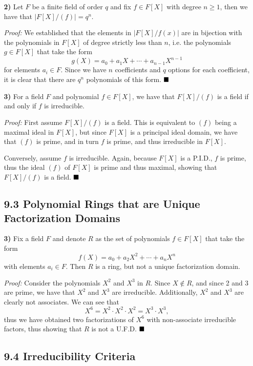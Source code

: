 \documentclass[12pt]{article}
\newcommand{\vertb}[1]{\left\vert#1\right\vert}
\newcommand{\proof}{\textit{Proof: }}
\newcommand{\done}{\ensuremath{\strut\hfill\blacksquare}}
\newcommand{\sectionskip}{\vspace{0.1in}}
\begin{document}
\sectionskip

\textbf{2)}
Let \( F \) be a finite field of order \( q \) and fix \( f \in F[X] \) with
degree \( n \geq 1 \), then we have that
\( \vertb{F[X]/(f)} = q^n \).

\proof
We established that the elements in \( \vertb{F[X]/f(x)} \) are in bijection
with the polynomials in \( F[X] \) of degree strictly less than \( n \),
i.e. the polynomials \( g \in F[X] \) that take the form
\[
	g(X) = a_0 + a_1X + \cdots + a_{n - 1}X^{n - 1}
\]
for elements \( a_i \in F \).
Since we have \( n \) coefficients and \( q \) options for each coefficient,
it is clear that there are \( q^n \) polynomials of this form.
\done

\textbf{3)}
For a field \( F \) and polynomial \( f \in F[X] \), we have that
\( F[X]/(f) \) is a field if and only if \( f \) is irreducible.

\proof
First assume \( F[X]/(f) \) is a field.
This is equivalent to \( (f) \) being a maximal ideal in \( F[X] \), but
since \( F[X] \) is a principal ideal domain, we have that \( (f) \) is prime,
and in turn \( f \) is prime, and thus irreducible in \( F[X] \).

Conversely, assume \( f \) is irreducible.
Again, because \( F[X] \) is a P.I.D., \( f \) is prime, thus the ideal
\( (f) \) of \( F[X] \) is prime and thus maximal, showing that
\( F[X]/(f) \) is a field.
\done

\subsection*{9.3 Polynomial Rings that are Unique Factorization Domains}

\textbf{3)}
Fix a field \( F \) and denote \( R \) as the set of polynomials
\( f \in F[X] \) that take the form
\[
	f(X) = a_0 + a_2X^2 + \cdots + a_nX^n
\]
with elements \( a_i \in F \).
Then \( R \) is a ring, but not a unique factorization domain.

\proof
Consider the polynomials \( X^2 \) and \( X^3 \) in \( R \).
Since \( X \notin R \), and since 2 and 3 are prime, we have that
\( X^2 \) and \( X^3 \) are irreducible.
Additionally, \( X^2 \) and \( X^3 \) are clearly not associates.
We can see that
\[
	X^6 = X^2 \cdot X^2 \cdot X^2 = X^3 \cdot X^3,
\]
thus we have obtained two factorizations of \( X^6 \) with non-associate
irreducible factors, thus showing that \( R \) is not a U.F.D.
\done

\subsection*{9.4 Irreducibility Criteria}
\end{document}
